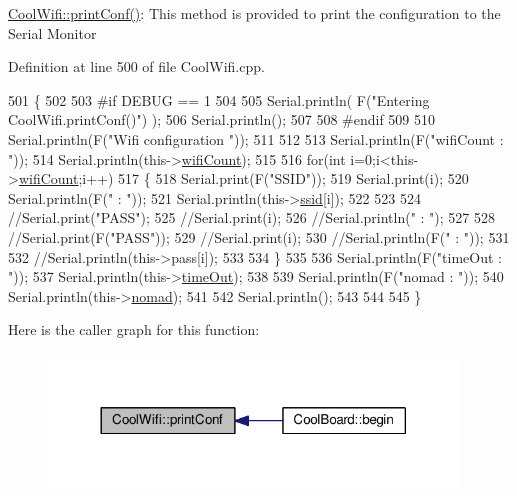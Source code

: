 \hyperlink{class_cool_wifi_a9e6105c6d13d35ec510f6633da9e0223}{Cool\+Wifi\+::print\+Conf()}\+: This method is provided to print the configuration to the Serial Monitor 

Definition at line 500 of file Cool\+Wifi.\+cpp.


\begin{DoxyCode}
501 \{
502 
503 \textcolor{preprocessor}{#if DEBUG == 1 }
504 
505     Serial.println( F(\textcolor{stringliteral}{"Entering CoolWifi.printConf()"}) );
506     Serial.println();   
507 
508 \textcolor{preprocessor}{#endif}
509     
510     Serial.println(F(\textcolor{stringliteral}{"Wifi configuration "}));
511 
512     
513     Serial.println(F(\textcolor{stringliteral}{"wifiCount : "}));
514     Serial.println(this->\hyperlink{class_cool_wifi_ab133bd92fcb895b884deecd6678592e4}{wifiCount});
515     
516     \textcolor{keywordflow}{for}(\textcolor{keywordtype}{int} i=0;i<this->\hyperlink{class_cool_wifi_ab133bd92fcb895b884deecd6678592e4}{wifiCount};i++)
517     \{   
518         Serial.print(F(\textcolor{stringliteral}{"SSID"}));
519         Serial.print(i);
520         Serial.println(F(\textcolor{stringliteral}{" : "}));
521         Serial.println(this->\hyperlink{class_cool_wifi_a893b21d0fed821438733bba2e73fb4c2}{ssid}[i]);
522                 
523 
524         \textcolor{comment}{//Serial.print("PASS");}
525         \textcolor{comment}{//Serial.print(i);}
526         \textcolor{comment}{//Serial.println(" : ");}
527 
528         \textcolor{comment}{//Serial.print(F("PASS"));}
529         \textcolor{comment}{//Serial.print(i);}
530         \textcolor{comment}{//Serial.println(F(" : "));}
531 
532         \textcolor{comment}{//Serial.println(this->pass[i]);}
533         
534     \}
535     
536     Serial.println(F(\textcolor{stringliteral}{"timeOut : "}));
537     Serial.println(this->\hyperlink{class_cool_wifi_a952111605f25156588b5632caaba1c6f}{timeOut});
538 
539     Serial.println(F(\textcolor{stringliteral}{"nomad : "}));
540     Serial.println(this->\hyperlink{class_cool_wifi_ab7d9643c4af7bac3be331ef008b2ea27}{nomad});
541 
542     Serial.println();
543 
544 
545 \}
\end{DoxyCode}
Here is the caller graph for this function\+:\nopagebreak
\begin{figure}[H]
\begin{center}
\leavevmode
\includegraphics[width=308pt]{d7/d29/class_cool_wifi_a9e6105c6d13d35ec510f6633da9e0223_icgraph}
\end{center}
\end{figure}
\mbox{\label{class_cool_wifi_a1c7b4d82a4098d346e7593dce92039fa}} 
